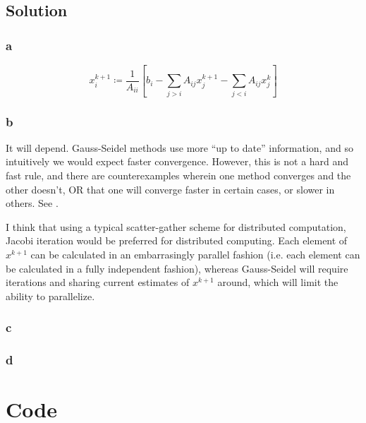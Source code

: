 \documentclass[11pt]{report}
\theoremstyle{definition}
\begin{document}
\subsection*{Solution}
\subsubsection*{a}
\[
	x_i^{k+1}\coloneqq \frac{1}{A_{ii}}\left[
	b_i - \sum_{j>i}A_{ij}x_{j}^{k+1}-\sum_{j<i}A_{ij}x_j^k
	\right]
\]

\subsubsection*{b}
It will depend. Gauss-Seidel methods use more ``up to date'' information, and so intuitively we would expect faster convergence. However,
this is not a hard and fast rule, and there are counterexamples wherein one method converges and the other doesn't, OR that one will converge faster in certain cases, or slower in others.
See \cite{Venit_1975}.

I think that using a typical scatter-gather scheme for distributed computation,
Jacobi iteration would be preferred for distributed computing. Each element of
$x^{k+1}$ can be calculated in an embarrasingly parallel fashion (i.e. each
element can be calculated in a fully independent fashion), whereas Gauss-Seidel
will require iterations and sharing current estimates of $x^{k+1}$ around, which
will limit the ability to parallelize.

\subsubsection*{c}

\subsubsection*{d}

\newpage
\section*{Code}

\lstset{style=mystyle}

\printbibliography
\end{document}
